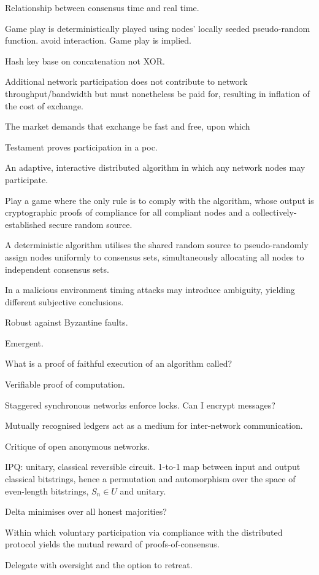 Relationship between consensus time and real time.

Game play is deterministically played using nodes' locally seeded pseudo-random function. avoid interaction. Game play is implied.

Hash key base on concatenation not XOR.

Additional network participation does not contribute to network throughput/bandwidth but must nonetheless be paid for, resulting in inflation of the cost of exchange.

The market demands that exchange be fast and free, upon which

Testament proves participation in a poc.

An adaptive, interactive distributed algorithm in which any network nodes may participate.

Play a game where the only rule is to comply with the algorithm, whose output is cryptographic proofs of compliance for all compliant nodes and a collectively-established secure random source. 

A deterministic algorithm utilises the shared random source to pseudo-randomly assign nodes uniformly to consensus sets, simultaneously allocating all nodes to independent consensus sets.

In a malicious environment timing attacks may introduce ambiguity, yielding different subjective conclusions.

Robust against Byzantine faults.

Emergent.

What is a proof of faithful execution of an algorithm called?

Verifiable proof of computation.

Staggered synchronous networks enforce locks. Can I encrypt messages?

Mutually recognised ledgers act as a medium for inter-network communication.

Critique of open anonymous networks.

IPQ: unitary, classical reversible circuit. 1-to-1 map between input and output classical bitstrings, hence a permutation and automorphism over the space of even-length bitstrings, $S_n\in U$ and unitary.

Delta minimises over all honest majorities?

Within which voluntary participation via compliance with the distributed protocol yields the mutual reward of proofs-of-consensus.

Delegate with oversight and the option to retreat.

